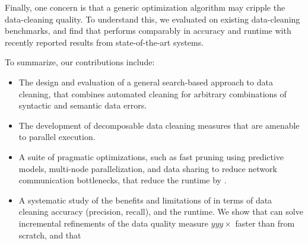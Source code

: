 Finally, one concern is that a generic optimization algorithm may cripple the data-cleaning quality.  To understand this, we evaluated \sys on  existing data-cleaning benchmarks, and find that \sys performs comparably in accuracy and runtime with recently reported results from state-of-the-art systems.  






\noindent To summarize, our contributions include:
\begin{itemize}[leftmargin=*, topsep=0mm, itemsep=0mm]
  \item The design and evaluation of a general search-based approach to data cleaning, that combines automated cleaning for arbitrary combinations of syntactic and semantic data errors.
  \item The development of decomposable data cleaning measures that are amenable to parallel execution.
  \item A suite of pragmatic optimizations, such as fast pruning using predictive models, multi-node parallelization, and data sharing to reduce network communication bottlenecks, that reduce the runtime by .
  \item A systematic study of the benefits and limitations of \sys in terms of data cleaning accuracy (precision, recall), and the runtime.  We show that \sys can solve incremental refinements of the data quality measure $yyy\times$ faster than from scratch, and that 
\end{itemize}


